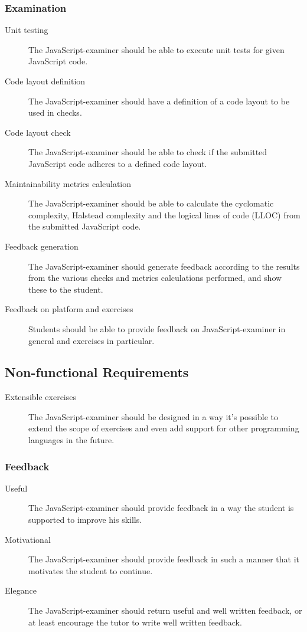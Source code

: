 \subsubsection{Examination}
\begin{description}
  \item[Unit testing] The JavaScript-examiner should be able to execute unit 
    tests for given JavaScript code.
  \item[Code layout definition] The JavaScript-examiner should have a
    definition of a code layout to be used in \glspl{check}.
  \item[Code layout check] The JavaScript-examiner should be able to check if 
    the submitted JavaScript code adheres to a defined code layout.
  \item[Maintainability metrics calculation] The JavaScript-examiner should be 
    able to calculate the cyclomatic complexity, Halstead complexity and the 
    logical lines of code (LLOC) from the submitted JavaScript code.
  \item[Feedback generation] The JavaScript-examiner should generate feedback
    according to the results from the various \glspl{check} and metrics calculations
    performed, and show these to the student.
  \item[Feedback on platform and exercises] Students should be able to provide
    feedback on JavaScript-examiner in general and exercises in particular.
\end{description}

\subsection{Non-functional Requirements}
\begin{description}
  \item[Extensible exercises] The JavaScript-examiner should be designed in a
    way it's possible to extend the scope of exercises and even add support for
    other programming languages in the future. 
\end{description}

\subsubsection{Feedback}
\begin{description}
  \item[Useful] The JavaScript-examiner should provide feedback in a way
    the student is supported to improve his skills.
  \item[Motivational] The JavaScript-examiner should provide feedback in such a
    manner that it motivates the student to continue.
  \item[Elegance] The JavaScript-examiner should return useful and well written 
    feedback, or at least encourage the tutor to write well written feedback.
\end{description}

